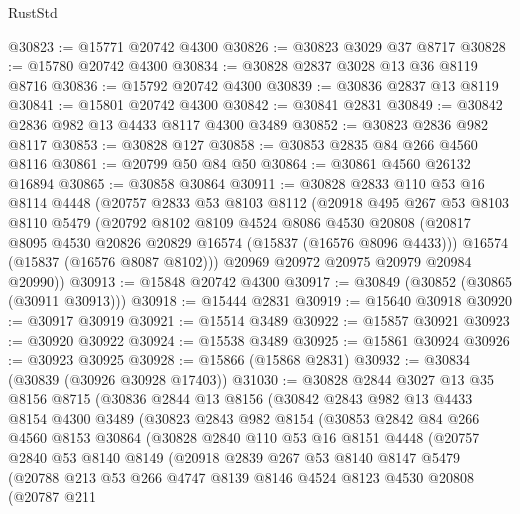 \begin{lexlean}{RustStd}
\begin{coremodule}
@30823 := @15771 @20742 @4300
@30826 := @30823 @3029 @37 @8717
@30828 := @15780 @20742 @4300
@30834 := @30828 @2837 @3028 @13 @36 @8119 @8716
@30836 := @15792 @20742 @4300
@30839 := @30836 @2837 @13 @8119
@30841 := @15801 @20742 @4300
@30842 := @30841 @2831
@30849 := @30842 @2836 @982 @13 @4433 @8117 @4300 @3489
@30852 := @30823 @2836 @982 @8117
@30853 := @30828 @127
@30858 := @30853 @2835 @84 @266 @4560 @8116
@30861 := @20799 @50 @84 @50
@30864 := @30861 @4560 @26132 @16894
@30865 := @30858 @30864
@30911 := @30828
    @2833
    @110
    @53
    @16
    @8114
    @4448
    (@20757
      @2833
      @53
      @8103
      @8112
      (@20918
        @495
        @267
        @53
        @8103
        @8110
        @5479
        (@20792
          @8102
          @8109
          @4524
          @8086
          @4530
          @20808
          (@20817 @8095 @4530 @20826 @20829 @16574 (@15837 (@16576 @8096 @4433)))
          @16574
          (@15837 (@16576 @8087 @8102)))
        @20969
        @20972
        @20975
        @20979
        @20984
        @20990))
@30913 := @15848 @20742 @4300
@30917 := @30849 (@30852 (@30865 (@30911 @30913)))
@30918 := @15444 @2831
@30919 := @15640 @30918
@30920 := @30917 @30919
@30921 := @15514 @3489
@30922 := @15857 @30921
@30923 := @30920 @30922
@30924 := @15538 @3489
@30925 := @15861 @30924
@30926 := @30923 @30925
@30928 := @15866 (@15868 @2831)
@30932 := @30834 (@30839 (@30926 @30928 @17403))
@31030 := @30828
    @2844
    @3027
    @13
    @35
    @8156
    @8715
    (@30836
      @2844
      @13
      @8156
      (@30842
        @2843
        @982
        @13
        @4433
        @8154
        @4300
        @3489
        (@30823
          @2843
          @982
          @8154
          (@30853
            @2842
            @84
            @266
            @4560
            @8153
            @30864
            (@30828
              @2840
              @110
              @53
              @16
              @8151
              @4448
              (@20757
                @2840
                @53
                @8140
                @8149
                (@20918
                  @2839
                  @267
                  @53
                  @8140
                  @8147
                  @5479
                  (@20788
                    @213
                    @53
                    @266
                    @4747
                    @8139
                    @8146
                    @4524
                    @8123
                    @4530
                    @20808
                    (@20787
                      @211

\end{coremodule}
\end{lexlean}
